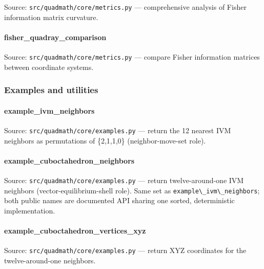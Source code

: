 \documentclass[
  10pt,
]{article}
\newcommand{\passthrough}[1]{#1}
\renewcommand{\texttt}[1]{%
    \colorbox{codebg}{\color{codefg}\ttfamily #1}%
}
\begin{document}
Source: \passthrough{\lstinline!src/quadmath/core/metrics.py!} ---
comprehensive analysis of Fisher information matrix curvature.

\paragraph{\texorpdfstring{\texttt{fisher\_quadray\_comparison}}{fisher\_quadray\_comparison}}\label{code:fisher_quadray_comparison}

Source: \passthrough{\lstinline!src/quadmath/core/metrics.py!} ---
compare Fisher information matrices between coordinate systems.

\subsubsection{Examples and utilities}\label{code:examples}

\paragraph{\texorpdfstring{\texttt{example\_ivm\_neighbors}}{example\_ivm\_neighbors}}\label{code:example_ivm_neighbors}

Source: \passthrough{\lstinline!src/quadmath/core/examples.py!} ---
return the 12 nearest IVM neighbors as permutations of \{2,1,1,0\}
(neighbor-move-set role).

\paragraph{\texorpdfstring{\texttt{example\_cuboctahedron\_neighbors}}{example\_cuboctahedron\_neighbors}}\label{code:example_cuboctahedron_neighbors}

Source: \passthrough{\lstinline!src/quadmath/core/examples.py!} ---
return twelve-around-one IVM neighbors (vector-equilibrium-shell role).
Same set as \passthrough{\lstinline!example\_ivm\_neighbors!}; both
public names are documented API sharing one sorted, deterministic
implementation.

\paragraph{\texorpdfstring{\texttt{example\_cuboctahedron\_vertices\_xyz}}{example\_cuboctahedron\_vertices\_xyz}}\label{code:example_cuboctahedron_vertices_xyz}

Source: \passthrough{\lstinline!src/quadmath/core/examples.py!} ---
return XYZ coordinates for the twelve-around-one neighbors.
\end{document}
